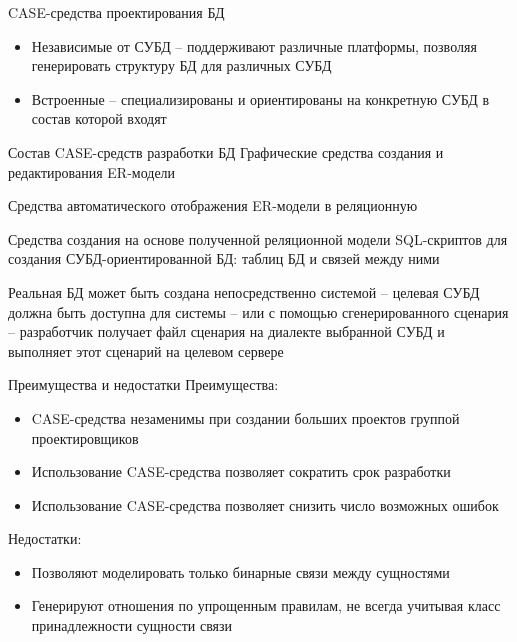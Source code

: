 \documentclass[12pt]{article}
\begin{document}
\begin{nota}{CASE-средства проектирования БД}
    \begin{itemize}
        \item Независимые от СУБД -- поддерживают различные платформы, позволяя генерировать структуру БД для различных СУБД 
        \item Встроенные -- специализированы и ориентированы на конкретную СУБД в состав которой входят 
    \end{itemize}
\end{nota}

\begin{nota}{Состав CASE-средств разработки БД}
    Графические средства создания и редактирования ER-модели

    Средства автоматического отображения ER-модели в реляционную

    Средства создания на основе полученной реляционной модели SQL-скриптов для создания СУБД-ориентированной БД: таблиц БД и связей между ними 

    Реальная БД может быть создана непосредственно системой -- целевая СУБД должна быть доступна для системы -- или с помощью сгенерированного сценария -- разработчик получает файл сценария на диалекте выбранной СУБД и выполняет этот сценарий на целевом сервере 
\end{nota}

\begin{Remark}{Преимущества и недостатки}
    Преимущества:

    \begin{itemize}
        \item CASE-средства незаменимы при создании больших проектов группой проектировщиков
        \item Использование CASE-средства позволяет сократить срок разработки 
        \item Использование CASE-средства позволяет снизить число возможных ошибок
    \end{itemize}

    Недостатки:

    \begin{itemize}
        \item Позволяют моделировать только бинарные связи между сущностями 
        \item Генерируют отношения по упрощенным правилам, не всегда учитывая класс принадлежности сущности связи 
    \end{itemize}
\end{Remark}
\end{document}
